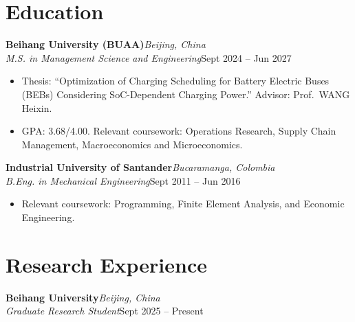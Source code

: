 \documentclass[11pt,a4paper]{article}
\newcommand{\cventry}[4]{%
	\noindent
	\textbf{#1}\hfill\textit{#2}\\
	\textit{#3}\hfill{#4}
	\par\vspace{1pt}
}
\begin{document}
	
	
	\section{Education}
	
	\cventry
	{Beihang University (BUAA)}
	{Beijing, China}
	{M.S. in Management Science and Engineering}
	{Sept 2024 -- Jun 2027}
	
	\begin{itemize}
		
		\item Thesis:
		``Optimization of Charging Scheduling for Battery Electric Buses (BEBs)
		Considering SoC-Dependent Charging Power.''
		Advisor: Prof.\ WANG Heixin.
		
		\item GPA: 3.68/4.00.
		Relevant coursework:
		Operations Research,
		Supply Chain Management,
		Macroeconomics and
		Microeconomics.
		
		
	\end{itemize}
	
	\vspace{4pt}
	
	\cventry
	{Industrial University of Santander}
	{Bucaramanga, Colombia}
	{B.Eng. in Mechanical Engineering}
	{Sept 2011 -- Jun 2016}
	
	\begin{itemize}
		
		\item Relevant coursework:
		Programming,
		Finite Element Analysis,
		and Economic Engineering.
		
	\end{itemize}
	
	
	
	\section{Research Experience}
	
	\cventry
	{Beihang University}
	{Beijing, China}
	{Graduate Research Student}
	{Sept 2025 -- Present}
	
\end{document}
